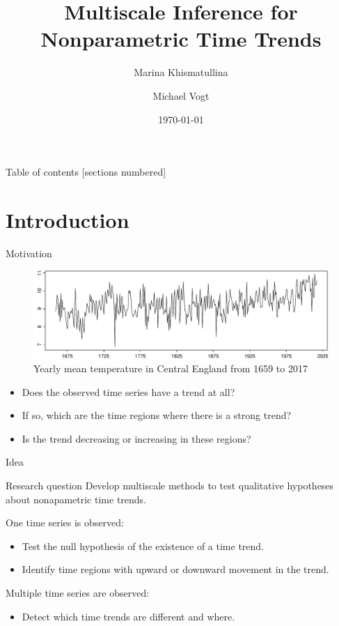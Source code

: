 \documentclass[10pt, handout]{beamer}
\title{Multiscale Inference for Nonparametric Time Trends}
\date{\today}
\author{Marina Khismatullina \inst{1} \and Michael Vogt \inst{1}}
\institute{\inst{1} University of Bonn}
\begin{document}
\maketitle

\begin{frame}{Table of contents}
  [sections numbered]
  \tableofcontents[hideallsubsections]
\end{frame}

\section{Introduction}

\begin{frame}{Motivation}
	\begin{figure}
		\centering
		\includegraphics[width=\textwidth]{temperature_data.pdf}
		\caption{Yearly mean temperature in Central England from 1659 to 2017}
		\label{figure:temperature_data}
	\end{figure}\pause
	\begin{itemize}
		\item Does the observed time series have a trend at all?\pause
		\item If so, which are the time regions where there is a strong trend?\pause
		\item Is the trend decreasing or increasing in these regions?
	 \end{itemize}
\end{frame}

\begin{frame}{Idea}
    \begin{block}{Research question}
	Develop multiscale methods to test qualitative hypotheses about nonapametric time trends.\pause
	
	One time series is observed:
	\begin{itemize}
		\item Test the null hypothesis of the existence of a time trend.
		\item Identify time regions with upward or downward movement in the trend.
	\end{itemize}\pause
	Multiple time series are observed:
	\begin{itemize}
		\item  Detect which time trends are different and where.
	\end{itemize}
    \end{block}
\end{frame}
\end{document}

